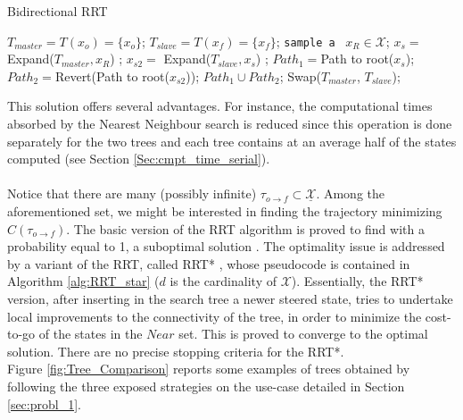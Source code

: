 \begin{algorithm}
\caption{Bidirectional RRT}\label{alg:RRT_bid}
\begin{algorithmic}[1]
\State $T_{master}= T(x_o)= \lbrace x_o \rbrace$;  
\State $T_{slave} = T(x_f)= \lbrace x_f \rbrace$; 
	\State \texttt{sample a}\,\,\, $x_R \in  \mathcal{X}$; 
	\State $x_s =$ Expand($T_{master} , x_R$) ;
		\State $x_{s2} =$ Expand($T_{slave} , x_s$) ;
		\State $Path_1=$Path to root($x_s$);
		\State $Path_2=$Revert(Path to root($x_{s2}$));
		\State \Return $Path_1 \cup Path_2$;
		\EndIf
	\EndIf
	\State Swap($T_{master}$, $T_{slave}$);
\EndFor
\EndProcedure
\end{algorithmic}
\end{algorithm}

This solution offers several advantages. For instance, the computational times absorbed by the Nearest Neighbour search is reduced since this operation is done separately for the two trees and each tree contains at an average half of the states computed (see Section \ref{Sec:cmpt_time_serial}).
\\
\\
Notice that there are many (possibly infinite) $\tau_{o \rightarrow f} \subset \underline{ \mathcal{X} }$. Among the aforementioned set, we might be interested in finding the trajectory minimizing $C(\tau_{o \rightarrow f})$. 
The basic version of the RRT algorithm is proved to find with a probability equal to 1, a suboptimal solution \cite{RRT_star}.
The optimality issue is addressed by a variant of the RRT, called RRT* \cite{RRT_star}, whose pseudocode is contained in Algorithm \ref{alg:RRT_star} ($d$ is the cardinality of $\mathcal{X}$).
Essentially, the RRT* version, after inserting in the search tree a newer steered state, tries to undertake local improvements to the connectivity of the tree, in order to minimize the cost-to-go of the states in the $Near$ set. This is proved to converge to the optimal solution. 
There are no precise stopping criteria for the RRT*.
\\
Figure \ref{fig:Tree_Comparison} reports some examples of trees obtained by following the three exposed strategies on the use-case detailed in Section \ref{sec:probl_1}.


